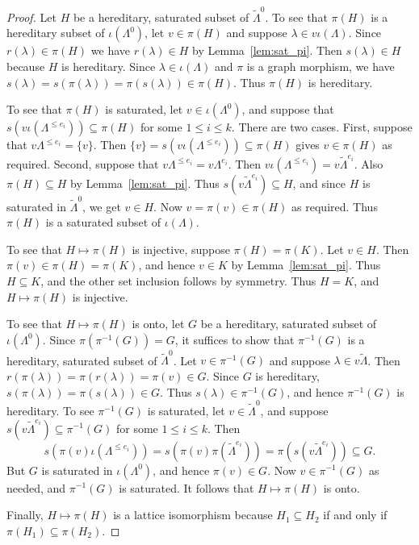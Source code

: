 \documentclass[a4paper,12pt]{amsart}
\numberwithin{equation}{section}
\theoremstyle{definition}
\theoremstyle{remark}
\begin{document}
\begin{proof}
Let $H$ be a hereditary, saturated subset of ${\tilde{\Lambda}}^0$. To see that $\pi(H)$ is a hereditary subset of $\iota(\Lambda^0)$, let $v\in\pi(H)$ and suppose $\lambda\in v\iota(\Lambda)$. Since $r(\lambda)\in\pi(H)$ we have $r(\lambda)\in H$ by Lemma~\ref{lem:sat_pi}. Then  $s(\lambda)\in H$ because $H$ is hereditary. Since $\lambda\in\iota(\Lambda)$ and $\pi$ is a graph morphism, we have $s(\lambda)=s(\pi(\lambda))=\pi(s(\lambda))\in\pi(H)$. Thus $\pi(H)$ is hereditary.

To see that $\pi(H)$ is  saturated, let $v\in \iota(\Lambda^0)$, and suppose that 
$s(v\iota(\Lambda^{\leq e_i}))\subseteq \pi(H)$ for some $1\leq i\leq k$.  There are two cases. First, suppose that $v\Lambda^{\leq e_i}=\{v\}$. Then $\{v\}=s(v\iota(\Lambda^{\leq e_i}))\subseteq \pi(H)$ gives $v\in\pi(H)$ as required.  Second, suppose that $v\Lambda^{\leq e_i}=v\Lambda^{e_i}$. Then $v\iota(\Lambda^{\leq e_i})=v{\tilde{\Lambda}}^{e_i}$. Also $\pi(H)\subseteq H$ by Lemma~\ref{lem:sat_pi}. Thus $s(v\tilde\Lambda^{e_i})\subseteq H$, and since $H$ is saturated in $\tilde\Lambda^0$, we get $v\in H$.  Now $v=\pi(v)\in\pi(H)$ as required.  Thus $\pi(H)$ is a saturated subset of $\iota(\Lambda)$.

To see that $H\mapsto\pi(H)$ is injective, suppose $\pi(H)=\pi(K)$. Let $v\in H$. Then  $\pi(v)\in \pi(H)=\pi(K)$, and hence $v\in K$ by Lemma~\ref{lem:sat_pi}. Thus $H\subseteq K$, and the other set inclusion follows by symmetry. Thus $H=K$, and $H\mapsto\pi(H)$ is injective.

To see that $H\mapsto\pi(H)$ is onto, let $G$ be a hereditary, saturated subset of $\iota(\Lambda^0)$.  Since $\pi(\pi^{-1}(G))=G$, it suffices to show that $\pi^{-1}(G)$ is a hereditary, saturated subset of $\tilde\Lambda^0$. Let $v\in \pi^{-1}(G)$ and suppose $\lambda\in v{\tilde{\Lambda}}$. Then $r(\pi(\lambda))=\pi(r(\lambda))=\pi(v)\in G$.  Since $G$ is hereditary, $s(\pi(\lambda))=\pi(s(\lambda))\in G$.  Thus $s(\lambda)\in \pi^{-1}(G)$, and hence $\pi^{-1}(G)$ is hereditary. To see $\pi^{-1}(G)$ is saturated, let $v\in{\tilde{\Lambda}}^0$, and suppose $s(v\tilde\Lambda^{e_i})\subseteq \pi^{-1}(G)$ for some $1\leq i\leq k$.  
Then
\[
s(\pi(v)\iota(\Lambda^{\leq e_i}))=s(\pi(v)\pi(\tilde\Lambda^{e_i}))=\pi(s(v\tilde\Lambda^{e_i}))\subseteq G.
\]
But $G$ is saturated in $\iota(\Lambda^0)$, and hence $\pi(v)\in G$. Now $v\in\pi^{-1}(G)$ as needed, and $\pi^{-1}(G)$ is saturated.  It follows that $H\mapsto\pi(H)$ is onto.

Finally, $H\mapsto\pi(H)$ is a lattice isomorphism because $H_1\subseteq H_2$ if and only if $\pi(H_1)\subseteq \pi(H_2)$. 
\end{proof}
\end{document}
